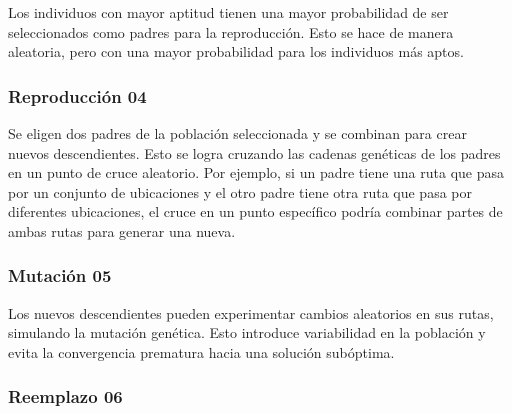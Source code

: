 Los individuos con mayor aptitud tienen una mayor probabilidad de ser seleccionados 
como padres para la reproducción. Esto se hace de manera aleatoria, pero con una mayor 
probabilidad para los individuos más aptos.

\subsubsection*{Reproducción 04} 

Se eligen dos padres de la población seleccionada y se combinan para crear nuevos 
descendientes. Esto se logra cruzando las cadenas genéticas de los padres en un punto 
de cruce aleatorio. Por ejemplo, si un padre tiene una ruta que pasa por un conjunto 
de ubicaciones y el otro padre tiene otra ruta que pasa por diferentes ubicaciones, 
el cruce en un punto específico podría combinar partes de ambas rutas para generar 
una nueva.


\subsubsection*{Mutación 05}

Los nuevos descendientes pueden experimentar cambios aleatorios en sus rutas, simulando 
la mutación genética. Esto introduce variabilidad en la población y evita la convergencia 
prematura hacia una solución subóptima.


\subsubsection*{Reemplazo 06}

